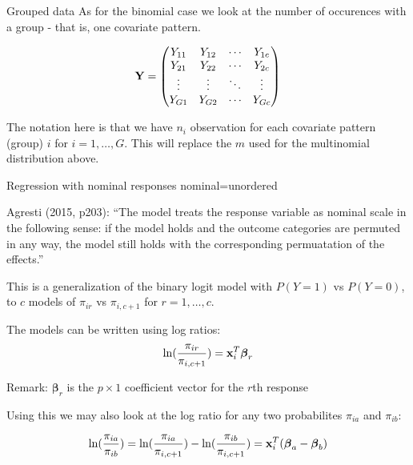 \documentclass[
  ignorenonframetext,
]{beamer}
\begin{document}
\begin{frame}
\begin{block}{Grouped data}
\protect\hypertarget{grouped-data}{}
As for the binomial case we look at the number of occurences with a
group - that is, one covariate pattern.

\[{\bf Y}=\begin{pmatrix} Y_{11}& Y_{12} & \cdots & Y_{1c}\\
Y_{21}& Y_{22} & \cdots & Y_{2c}\\
\vdots & \vdots & \ddots & \vdots\\
Y_{G1}& Y_{G2} & \cdots & Y_{Gc}\\
\end{pmatrix}\]

The notation here is that we have \(n_i\) observation for each covariate
pattern (group) \(i\) for \(i=1,\ldots,G\). This will replace the \(m\)
used for the multinomial distribution above.
\end{block}
\end{frame}

\begin{frame}{Regression with nominal responses}
\protect\hypertarget{regression-with-nominal-responses}{}
nominal=unordered

Agresti (2015, p203): ``The model treats the response variable as
nominal scale in the following sense: if the model holds and the outcome
categories are permuted in any way, the model still holds with the
corresponding permuatation of the effects.''
\end{frame}

\begin{frame}
This is a generalization of the binary logit model with \(P(Y=1)\) vs
\(P(Y=0)\), to \(c\) models of \(\pi_{ir}\) vs \(\pi_{i,c+1}\) for
\(r=1,\ldots,c\).

The models can be written using log ratios:
\[ \ln(\frac{\pi_{ir}}{\pi_{i,c+1}})={\bf x}_i^T {\boldsymbol \beta}_r\]

Remark: \({\boldsymbol \beta}_r\) is the \(p\times 1\) coefficient
vector for the \(r\)th response

Using this we may also look at the log ratio for any two probabilites
\(\pi_{ia}\) and \(\pi_{ib}\):

\[\ln(\frac{\pi_{ia}}{\pi_{ib}})=\ln(\frac{\pi_{ia}}{\pi_{i,c+1}})-\ln(\frac{\pi_{ib}}{\pi_{i,c+1}})={\bf x}_i^T ({\boldsymbol \beta}_a-{\boldsymbol \beta}_b)\]
\end{frame}
\end{document}
